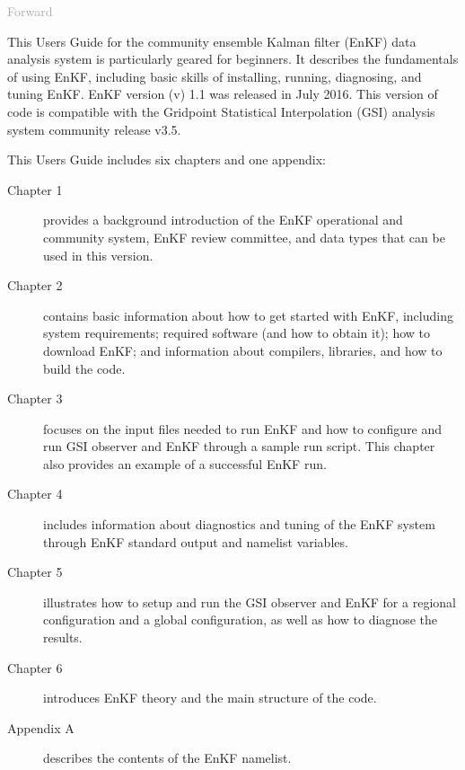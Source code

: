 \begin{titlepage}
\vspace*{0.5cm}
\noindent

\begin{flushleft}
\textcolor{darkgray}{\LARGE Forward}
\vspace*{1cm}\par

This User\textquotesingle s Guide for the community ensemble Kalman filter (EnKF) data analysis system is particularly geared for beginners. 
It describes the fundamentals of using EnKF, including basic skills of installing, running, diagnosing, and tuning EnKF. EnKF version (v) 1.1 was released in July 2016. This version of code is compatible with the Gridpoint Statistical Interpolation (GSI) analysis system community release v3.5.

This User\textquotesingle s Guide includes six chapters and one appendix:

\begin{description}
\item[Chapter 1] provides a background introduction of the EnKF operational and community system, EnKF review committee, and data types that can be used in this version.
\item[Chapter 2] contains basic information about how to get started with EnKF, including system requirements; required software (and how to obtain it); how to download EnKF; and information about compilers, libraries, and how to build the code.
\item[Chapter 3] focuses on the input files needed to run EnKF and how to configure and run GSI observer and EnKF through a sample run script. This chapter also provides an example of a successful EnKF run.
\item[Chapter 4] includes information about diagnostics and tuning of the EnKF system through EnKF standard output and namelist variables.
\item[Chapter 5] illustrates how to setup and run the GSI observer and EnKF for a regional configuration and a global configuration, as well as how to diagnose the results.
\item[Chapter 6] introduces EnKF theory and the main structure of the code. 
\item[Appendix A] describes the contents of the EnKF namelist.
\end{description}


\end{flushleft}
\end{titlepage}
